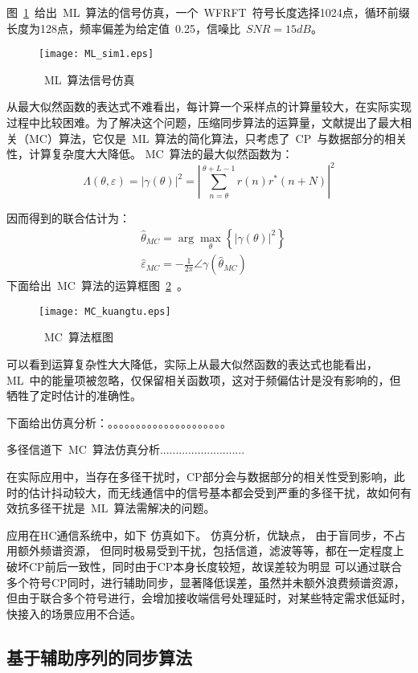图~\ref{ML_sim1}~给出~ML~算法的信号仿真，一个~WFRFT~符号长度选择1024点，循环前缀长度为128点，频率偏差为给定值~0.25，信噪比~$SNR=15dB$。
\begin{figure}[htbp]
\centering
\texttt{[image: ML\_sim1.eps]}
\caption{~ML~算法信号仿真}\vspace{-1em}\label{ML_sim1}
\end{figure}


从最大似然函数的表达式不难看出，每计算一个采样点的计算量较大，在实际实现过程中比较困难。为了解决这个问题，压缩同步算法的运算量，文献提出了最大相关（MC）算法，它仅是~ML~算法的简化算法，只考虑了~CP~与数据部分的相关性，计算复杂度大大降低。
MC~算法的最大似然函数为：
\begin{equation}
\Lambda \left( {\theta ,\varepsilon } \right) = {\left| {\gamma \left( \theta  \right)} \right|^2} = {\left| {\sum\limits_{n = \theta }^{\theta  + L - 1} {r\left( n \right){r^*}\left( {n + N} \right)} } \right|^2}
\end{equation}

因而得到的联合估计为：
\begin{align}
&{{\hat \theta }_{MC}} = \arg \mathop {\max }\limits_\theta  \left\{ {{{\left| {\gamma \left( \theta  \right)} \right|}^2}} \right\} \\
&{{\hat \varepsilon }_{MC}} =  - \frac{1}{{2\pi }}\angle \gamma \left( {{{\hat \theta }_{MC}}} \right)
\end{align}
下面给出~MC~算法的运算框图~\ref{MC_kuangtu}~。
\begin{figure}[htbp]
\centering
\texttt{[image: MC\_kuangtu.eps]}
\caption{~MC~算法框图}\vspace{-1em}\label{MC_kuangtu}
\end{figure}

可以看到运算复杂性大大降低，实际上从最大似然函数的表达式也能看出，ML~中的能量项被忽略，仅保留相关函数项，这对于频偏估计是没有影响的，但牺牲了定时估计的准确性。


下面给出仿真分析：。。。。。。。。。。。。。。。。。。。。。




多径信道下~MC~算法仿真分析...........................

在实际应用中，当存在多径干扰时，CP部分会与数据部分的相关性受到影响，此时的估计抖动较大，而无线通信中的信号基本都会受到严重的多径干扰，故如何有效抗多径干扰是~ML~算法需解决的问题。




应用在HC通信系统中，如下
仿真如下。
仿真分析，优缺点，
由于盲同步，不占用额外频谱资源， 但同时极易受到干扰，包括信道，滤波等等，都在一定程度上破坏CP前后一致性，同时由于CP本身长度较短，故误差较为明显
可以通过联合多个符号CP同时，进行辅助同步，显著降低误差，虽然并未额外浪费频谱资源，但由于联合多个符号进行，会增加接收端信号处理延时，对某些特定需求低延时，快接入的场景应用不合适。




\subsection{基于辅助序列的同步算法}






